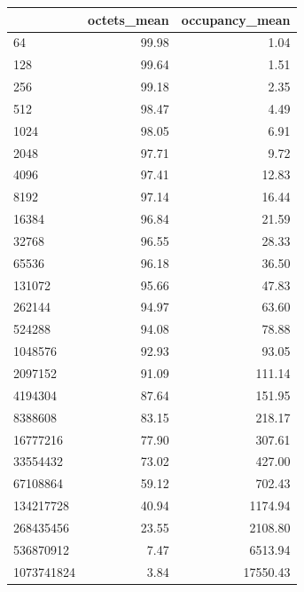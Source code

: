 \begin{tabular}{lrr}
\toprule
 & octets_mean & occupancy_mean \\
\midrule
64 & 99.98 & 1.04 \\
128 & 99.64 & 1.51 \\
256 & 99.18 & 2.35 \\
512 & 98.47 & 4.49 \\
1024 & 98.05 & 6.91 \\
2048 & 97.71 & 9.72 \\
4096 & 97.41 & 12.83 \\
8192 & 97.14 & 16.44 \\
16384 & 96.84 & 21.59 \\
32768 & 96.55 & 28.33 \\
65536 & 96.18 & 36.50 \\
131072 & 95.66 & 47.83 \\
262144 & 94.97 & 63.60 \\
524288 & 94.08 & 78.88 \\
1048576 & 92.93 & 93.05 \\
2097152 & 91.09 & 111.14 \\
4194304 & 87.64 & 151.95 \\
8388608 & 83.15 & 218.17 \\
16777216 & 77.90 & 307.61 \\
33554432 & 73.02 & 427.00 \\
67108864 & 59.12 & 702.43 \\
134217728 & 40.94 & 1174.94 \\
268435456 & 23.55 & 2108.80 \\
536870912 & 7.47 & 6513.94 \\
1073741824 & 3.84 & 17550.43 \\
\bottomrule
\end{tabular}
